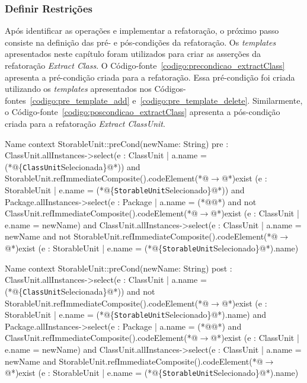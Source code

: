 \subsubsection{Definir Restrições}

Após identificar as operações e implementar a refatoração, o próximo passo consiste na definição das pré- e pós-condições da refatoração. Os \textit{templates} apresentados neste capítulo foram utilizados para criar as asserções da refatoração \textit{Extract Class}. O Código-fonte~\ref{codigo:precondicao_extractClass} apresenta a pré-condição criada para a refatoração. Essa pré-condição foi criada utilizando os \textit{templates} apresentados nos Códigos-fontes~\ref{codigo:pre_template_add} e~\ref{codigo:pre_template_delete}. Similarmente, o Código-fonte~\ref{codigo:poscondicao_extractClass} apresenta a pós-condição criada para a refatoração \textit{Extract ClassUnit}.

\begin{codigo}[caption={[Pré-condição da refatoração \textit{Extract Class}.] Pré-condição da refatoração \textit{Extract Class}.},escapeinside={(*@}{@*)}, basicstyle=\footnotesize, label={codigo:precondicao_extractClass}, language=OCL]{Name}
context StorableUnit::preCond(newName: String)
pre : ClassUnit.allInstances->select(e : ClassUnit | a.name = (*@\{\texttt{ClassUnit}Selecionada\}@*)) and StorableUnit.refImmediateComposite().codeElement(*@$\rightarrow$@*)exist (e : StorableUnit | e.name = (*@\{\texttt{StorableUnit}Selecionado\}@*))
and Package.allInstances->select(e : Package | a.name = (*@@*) and not ClassUnit.refImmediateComposite().codeElement(*@$\rightarrow$@*)exist (e : ClassUnit | e.name = newName) 
and ClassUnit.allInstances->select(e : ClassUnit | a.name = newName and not StorableUnit.refImmediateComposite().codeElement(*@$\rightarrow$@*)exist (e : StorableUnit | e.name = (*@\{\texttt{StorableUnit}Selecionado\}@*).name) 
\end{codigo}

\begin{codigo}[caption={[Pós-condição da refatoração \textit{Extract ClassUnit}.] Pós-condição da refatoração \textit{Extract ClassUnit}.},escapeinside={(*@}{@*)}, basicstyle=\footnotesize, label={codigo:poscondicao_extractClass}, language=OCL]{Name}
context StorableUnit::preCond(newName: String)
post : ClassUnit.allInstances->select(e : ClassUnit | a.name = (*@\{\texttt{ClassUnit}Selecionada\}@*)) and not StorableUnit.refImmediateComposite().codeElement(*@$\rightarrow$@*)exist (e : StorableUnit | e.name = (*@\{\texttt{StorableUnit}Selecionado\}@*).name)
and Package.allInstances->select(e : Package | a.name = (*@@*) and ClassUnit.refImmediateComposite().codeElement(*@$\rightarrow$@*)exist (e : ClassUnit | e.name = newName) 
and ClassUnit.allInstances->select(e : ClassUnit | a.name = newName and StorableUnit.refImmediateComposite().codeElement(*@$\rightarrow$@*)exist (e : StorableUnit | e.name = (*@\{\texttt{StorableUnit}Selecionado\}@*).name) 
\end{codigo}

